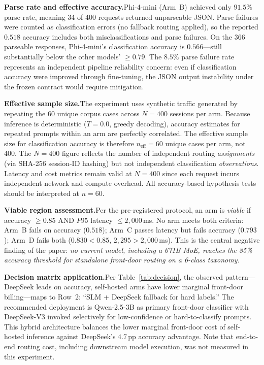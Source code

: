 \documentclass{article}
\begin{document}
\textbf{Parse rate and effective accuracy.}\quad Phi-4-mini (Arm~B) achieved only $91.5\%$ parse rate, meaning 34 of 400 requests returned unparseable JSON. Parse failures were counted as classification errors (no fallback routing applied), so the reported $0.518$ accuracy includes both misclassifications and parse failures. On the 366 parseable responses, Phi-4-mini's classification accuracy is $0.566$---still substantially below the other models' $\geq 0.79$. The $8.5\%$ parse failure rate represents an independent pipeline reliability concern: even if classification accuracy were improved through fine-tuning, the JSON output instability under the frozen contract would require mitigation.

\textbf{Effective sample size.}\quad The experiment uses synthetic traffic generated by repeating the 60 unique corpus cases across $N = 400$ sessions per arm. Because inference is deterministic ($T = 0.0$, greedy decoding), accuracy estimates for repeated prompts within an arm are perfectly correlated. The effective sample size for classification accuracy is therefore $n_{\text{eff}} = 60$ unique cases per arm, not 400. The $N = 400$ figure reflects the number of independent routing \emph{assignments} (via SHA-256 session-ID hashing) but not independent classification \emph{observations}. Latency and cost metrics remain valid at $N = 400$ since each request incurs independent network and compute overhead. All accuracy-based hypothesis tests should be interpreted at $n = 60$.

\textbf{Viable region assessment.}\quad Per the pre-registered protocol, an arm is \emph{viable} if accuracy $\geq 0.85$ AND $P95$ latency $\leq 2{,}000$\,ms. No arm meets both criteria: Arm~B fails on accuracy ($0.518$); Arm~C passes latency but fails accuracy ($0.793$); Arm~D fails both ($0.830 < 0.85$, $2{,}295 > 2{,}000$\,ms). This is the central negative finding of the paper: \emph{no current model, including a 671B MoE, reaches the 85\% accuracy threshold for standalone front-door routing on a 6-class taxonomy.}

\textbf{Decision matrix application.}\quad Per Table~\ref{tab:decision}, the observed pattern---DeepSeek leads on accuracy, self-hosted arms have lower marginal front-door billing---maps to Row~2: ``SLM + DeepSeek fallback for hard labels.'' The recommended deployment is Qwen-2.5-3B as primary front-door classifier with DeepSeek-V3 invoked selectively for low-confidence or hard-to-classify prompts. This hybrid architecture balances the lower marginal front-door cost of self-hosted inference against DeepSeek's $4.7$\,pp accuracy advantage. Note that end-to-end routing cost, including downstream model execution, was not measured in this experiment.
\end{document}
